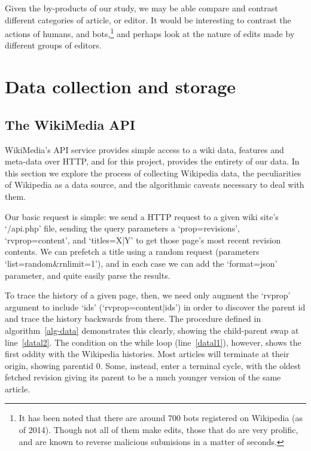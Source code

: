 Given the by-products of our study, we may be able compare and
contrast different categories of article, or editor. It would be
interesting to contrast the actions of humans, and bots,\footnote{It
  has been noted that there are around 700 bots registered on
  Wikipedia (as of 2014). Though not all of them make edits, those
  that do are very prolific, and are known to reverse malicious
  submisions in a matter of seconds.\cite{wiki-bots}\cite{bbc-bots}}
and perhaps look at the nature of edits made by different groups of
editors.

\section{Data collection and storage}
\subsection*{The WikiMedia API}
WikiMedia's API service provides simple access to a wiki data,
features and meta-data over HTTP,\cite{wiki-api} and for this project,
provides the entirety of our data. In this section we explore the
process of collecting Wikipedia data, the peculiarities of Wikipedia
as a data source, and the algorithmic caveats necessary to deal with
them.

Our basic request is simple: we send a HTTP request to a given wiki
site's `/api.php' file, sending the query parameters a
`prop=revisions', `rvprop=content', and `titles=X|Y' to get those
page's most recent revision contents. We can prefetch a title using a
random request (parameters `list=random\&rnlimit=1'), and in each case
we can add the `format=json' parameter, and quite easily parse the
results. 

To trace the history of a given page, then, we need only augment the
`rvprop' argument to include `ids' (`rvprop=content|ids') in order to
discover the parent id and trace the history backwards from there. The
procedure defined in algorithm~\ref{alg-data} demonstrates this
clearly, showing the child-parent swap at line~\ref{datal2}. The
condition on the while loop (line~\ref{datal1}), however, shows the
first oddity with the Wikipedia histories. Most articles will
terminate at their origin, showing parentid 0. Some, instead, enter a
terminal cycle, with the oldest fetched revision giving its parent to
be a much younger version of the same article. 

